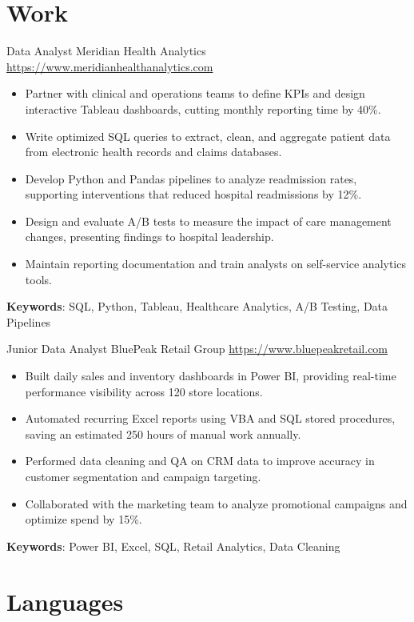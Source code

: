 \documentclass[a4paper, serif, 10pt]{moderncv}
\begin{document}
\section{Work}

        {Data Analyst}
        {Meridian Health Analytics}
        {\url{https://www.meridianhealthanalytics.com}}
        {}
        {\begin{itemize}
\item Partner with clinical and operations teams to define KPIs and design interactive Tableau dashboards, cutting monthly reporting time by 40\%.
\item Write optimized SQL queries to extract, clean, and aggregate patient data from electronic health records and claims databases.
\item Develop Python and Pandas pipelines to analyze readmission rates, supporting interventions that reduced hospital readmissions by 12\%.
\item Design and evaluate A/B tests to measure the impact of care management changes, presenting findings to hospital leadership.
\item Maintain reporting documentation and train analysts on self-service analytics tools.
\end{itemize}
\textbf{Keywords}: SQL, Python, Tableau, Healthcare Analytics, A/B Testing, Data Pipelines}

        {Junior Data Analyst}
        {BluePeak Retail Group}
        {\url{https://www.bluepeakretail.com}}
        {}
        {\begin{itemize}
\item Built daily sales and inventory dashboards in Power BI, providing real-time performance visibility across 120 store locations.
\item Automated recurring Excel reports using VBA and SQL stored procedures, saving an estimated 250 hours of manual work annually.
\item Performed data cleaning and QA on CRM data to improve accuracy in customer segmentation and campaign targeting.
\item Collaborated with the marketing team to analyze promotional campaigns and optimize spend by 15\%.
\end{itemize}
\textbf{Keywords}: Power BI, Excel, SQL, Retail Analytics, Data Cleaning}
\section{Languages}
\end{document}
